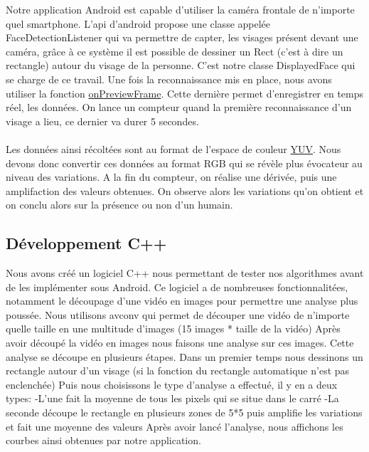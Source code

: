 	Notre application Android est capable d'utiliser la caméra frontale de n'importe quel smartphone. L'api d'android propose une classe appelée FaceDetectionListener qui va permettre de capter, les visages présent 
	devant une caméra, grâce à ce système il est possible de dessiner un Rect (c'est à dire un rectangle) autour du visage de la personne. C'est notre classe DisplayedFace qui se charge de ce travail. Une fois la 
	reconnaissance mis en place, nous avons utiliser la fonction \href{http://developer.android.com/reference/android/hardware/Camera.PreviewCallback.html#onPreviewFrame\%28byte\%5B\%5D,\%20android.hardware.Camera\%29}{onPreviewFrame}. Cette dernière permet d'enregistrer en temps réel, les données. On lance un compteur quand la première reconnaissance d'un visage a lieu, ce dernier va durer 5 secondes.\\
\\
	Les données ainsi récoltées sont au format de l'espace de couleur \href{http://fr.wikipedia.org/wiki/YUV}{YUV}. Nous devons donc convertir ces données au format RGB qui se révèle plus évocateur au niveau des variations. 
	A la fin du compteur, on réalise une dérivée, puis une amplifaction des valeurs obtenues. On observe alors les variations qu'on obtient et on conclu alors sur la présence ou non d'un humain.

\subsection{Développement C++}

	Nous avons créé un logiciel C++ nous permettant de tester nos algorithmes avant de les implémenter sous Android.
	Ce logiciel a de nombreuses fonctionnalitées, notamment le découpage d'une vidéo en images pour permettre une analyse plus poussée.
	Nous utilisons avconv qui permet de découper une vidéo de n'importe quelle taille en une multitude d'images (15 images * taille de la vidéo)
	Après avoir découpé la vidéo en images nous faisons une analyse sur ces images.
	Cette analyse se découpe en plusieurs étapes.
	Dans un premier temps nous dessinons un rectangle autour d'un visage (si la fonction du rectangle automatique n'est pas enclenchée)
	Puis nous choisissons le type d'analyse a effectué, il y en a deux types:
		-L'une fait la moyenne de tous les pixels qui se situe dans le carré
		-La seconde découpe le rectangle en plusieurs zones de 5*5 puis amplifie les variations et fait une moyenne des valeurs
	Après avoir lancé l'analyse, nous affichons les courbes ainsi obtenues par notre application.\\

